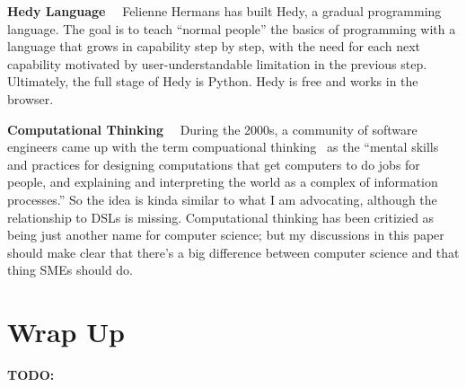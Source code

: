 \documentclass[runningheads]{llncs}
\newcommand\parhead[1]{\vspace{1mm}\noindent\textbf{{#1}}\ \ }
\newcommand\todo[1]{\vspace{1mm}\noindent\textbf{\color{red} {{TODO: {#1}} }}}
\begin{document}
\parhead{Hedy Language} Felienne Hermans has built Hedy, a gradual programming 
language. The goal is to teach ``normal people'' the basics of programming
with a language that grows in capability step by step, with the need for
each next capability motivated by user-understandable limitation in the
previous step. Ultimately, the full stage of Hedy is Python. Hedy is free
and works in the browser. 



\parhead{Computational Thinking} During the 2000s, a community of software
engineers came up with the term compuational thinking~\cite{denning2019computational} as the ``mental skills and
practices for designing computations that get computers to do jobs for people,
and explaining and interpreting the world as a complex of information
processes.''
So the idea is kinda similar to what I am advocating, although the relationship
to DSLs is missing. Computational thinking has been critizied as being just
another name for computer science; but my discussions in this paper should make
clear that there's a big difference between computer science and that thing SMEs
should do.

\section{Wrap Up}

\todo{}









\end{document}
